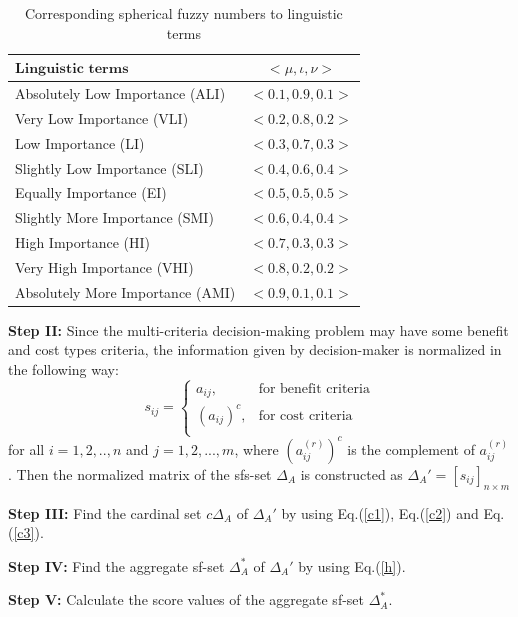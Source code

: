 \documentclass{IJFS}
\begin{document}
\begin{table}[htbp]
\begin{center}\caption{Corresponding spherical fuzzy numbers to linguistic terms \label{tab1}}
\begin{tabular}{l c} \hline
$\textbf{Linguistic terms}$  &$<\mu, \iota,
\nu>$ \\
\hline Absolutely Low
Importance (ALI)& $<0.1, 0.9, 0.1>$\\
Very Low Importance (VLI)& $<0.2, 0.8, 0.2>$ \\
Low Importance (LI)& $<0.3, 0.7, 0.3>$\\
 Slightly Low Importance
(SLI)&$<0.4, 0.6, 0.4>$\\
Equally
Importance (EI)& $<0.5, 0.5, 0.5>$\\
Slightly More Importance (SMI)&$<0.6, 0.4, 0.4>$\\
 High Importance (HI) & $<0.7, 0.3,
0.3>$\\
Very High Importance (VHI) &$<0.8, 0.2, 0.2>$\\
Absolutely More Importance (AMI)& $<0.9, 0.1, 0.1>$\\
\hline
\end{tabular}\end{center}
\end{table}

\textbf{Step II:}  Since the multi-criteria decision-making problem may have some benefit and cost types criteria, the information given by decision-maker is normalized in the following way:
\begin{equation*}
\displaystyle s_{ij}=\begin{cases}
a_{ij}, &\text{for benefit criteria}\\
(a_{ij})^c, &\text{for cost criteria}\\
\end{cases} 
\end{equation*} for all $i=1,2,..,n$ and $j=1,2,...,m$, where $(a_{ij}^{(r)})^c$ is the complement of $a_{ij}^{(r)}$. Then the normalized matrix of the
sfs-set $\Delta_A$ is constructed as $\Delta_A'=[s_{ij}]_{n\times m}$

\textbf{Step III:} Find the cardinal set $c\Delta_A$ of $\Delta_A'$
by using Eq.(\ref{c1}), Eq.(\ref{c2}) and Eq.(\ref{c3}).

\textbf{Step IV:} Find the aggregate sf-set $\Delta_A^*$ of
$\Delta_A'$ by using Eq.(\ref{h}).

\textbf{Step V:} Calculate the score values of the aggregate
sf-set $\Delta_A^*$.
\end{document}
